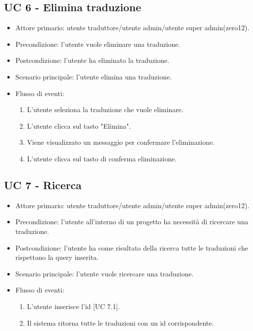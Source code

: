 \subsection{UC 6 - Elimina traduzione}
    \begin{itemize}
        \item Attore primario: utente traduttore/utente admin/utente super admin(zero12).
        \item Precondizione: l'utente vuole eliminare una traduzione.
        \item Postcondizione: l'utente ha eliminato la traduzione.
        \item Scenario principale: l'utente elimina una traduzione.
        \item Flusso di eventi:
            \begin{enumerate}
                \item L'utente seleziona la traduzione che vuole eliminare.
                \item L'utente clicca sul tasto "Elimina".
                \item Viene visualizzato un messaggio per confermare l'eliminazione.
                \item L'utente clicca sul tasto di conferma eliminazione.
            \end{enumerate}
    \end{itemize}
\subsection{UC 7 - Ricerca}
    \begin{itemize}
        \item Attore primario: utente traduttore/utente admin/utente super admin(zero12).
        \item Precondizione: l'utente all'interno di un progetto ha necessità di ricercare una traduzione.
        \item Postcondizione: l'utente ha come risultato della ricerca tutte le traduzioni che rispettano la query inserita.
        \item Scenario principale: l'utente vuole ricercare una traduzione.
        \item Flusso di eventi:
            \begin{enumerate}
                \item L'utente inserisce l'id [UC 7.1].
                \item Il sistema ritorna tutte le traduzioni con un id corrispondente.
            \end{enumerate}
    \end{itemize}
